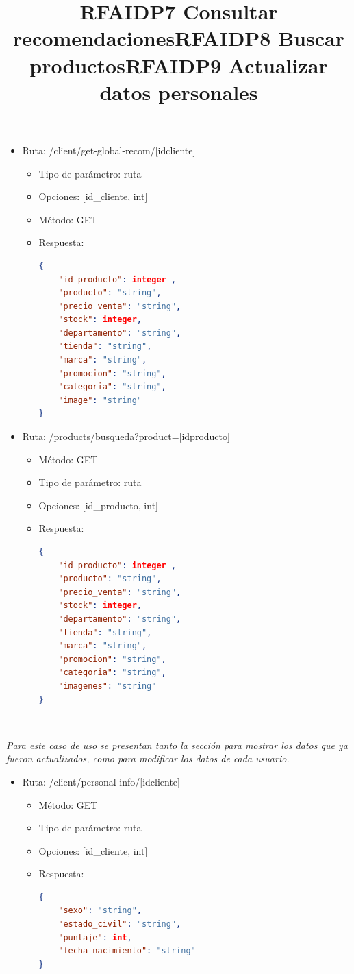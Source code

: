 \title{\textbf{RFAIDP7 Consultar recomendaciones}}
\begin{itemize}
\item Ruta: /client/get-global-recom/[idcliente]
\begin{itemize}
\item Tipo de parámetro: ruta
\item Opciones: [id\_cliente, int]
\item Método: GET
\item Respuesta:
\begin{lstlisting}[language=json,firstnumber=1]
{
	"id_producto": integer ,
	"producto": "string",
	"precio_venta": "string",
	"stock": integer,
	"departamento": "string",
	"tienda": "string",
	"marca": "string", 
	"promocion": "string",
	"categoria": "string",
	"image": "string"
}
\end{lstlisting}
\end{itemize}
\end{itemize}
\title{\textbf{RFAIDP8 Buscar productos}}
\begin{itemize}
\item Ruta: /products/busqueda?product=[idproducto]
\begin{itemize}
\item Método: GET
\item Tipo de parámetro: ruta
\item Opciones: [id\_producto, int]
\item Respuesta: 
\begin{lstlisting}[language=json,firstnumber=1]
{
	"id_producto": integer ,
	"producto": "string",
	"precio_venta": "string",
	"stock": integer,
	"departamento": "string",
	"tienda": "string",
	"marca": "string", 
	"promocion": "string",
	"categoria": "string",
	"imagenes": "string"
}
\end{lstlisting}
\end{itemize}
\end{itemize}
\title{\textbf{RFAIDP9  Actualizar datos personales}}
\\ \par
\textit{Para este caso de uso se presentan tanto la sección para mostrar los datos que ya fueron actualizados, como para modificar los datos de cada usuario.}
\begin{itemize}
\item Ruta: /client/personal-info/[idcliente]
\begin{itemize}
\item Método: GET
\item Tipo de parámetro: ruta
\item Opciones: [id\_cliente, int]
\item Respuesta: 
\begin{lstlisting}[language=json,firstnumber=1]
{
	"sexo": "string",
	"estado_civil": "string",
	"puntaje": int,
	"fecha_nacimiento": "string"
}
\end{lstlisting}
\end{itemize}
\end{itemize}

